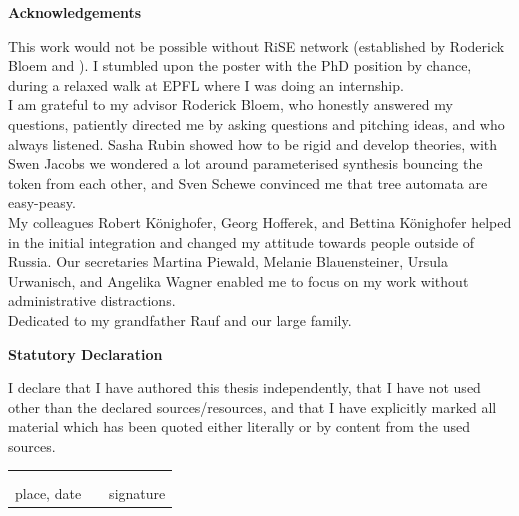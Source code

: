 \restoregeometry

\cleardoublepage

\pagestyle{plain}


\begin{center}
{\Large\bfseries Acknowledgements}
\end{center}
This work would not be possible without RiSE network (established by Roderick Bloem and ).
I stumbled upon the poster with the PhD position by chance,
during a relaxed walk at EPFL where I was doing an internship.\\
I am grateful to my advisor Roderick Bloem,
who honestly answered my questions, patiently directed me by asking questions and pitching ideas,
and who always listened.
Sasha Rubin showed how to be rigid and develop theories,
with Swen Jacobs we wondered a lot around parameterised synthesis bouncing the token from each other,
and Sven Schewe convinced me that tree automata are easy-peasy.\\
My colleagues Robert K\"onighofer, Georg Hofferek, and Bettina K\"onighofer helped
in the initial integration and changed my attitude towards people outside of Russia.
Our secretaries Martina Piewald, Melanie Blauensteiner, Ursula Urwanisch, and Angelika Wagner
enabled me to focus on my work without administrative distractions.\\
Dedicated to my grandfather Rauf and our large family.

\cleardoublepage

\begin{center}
{\Large\bfseries Statutory Declaration}
\end{center}
\vspace{5mm}
\noindent
I declare that I have authored this thesis independently, that I have
not used other than the declared sources/resources, and that I have
explicitly marked all material which has been quoted either literally
or by content from the used sources.

\vspace{2cm}

\noindent
\begin{tabular}{ccc}
\hspace*{5cm}     & \hspace*{1.5cm}   & \hspace*{5.7cm}\\
\dotfill          &                 & \dotfill\\
place, date       &                 & signature\\
\end{tabular}




